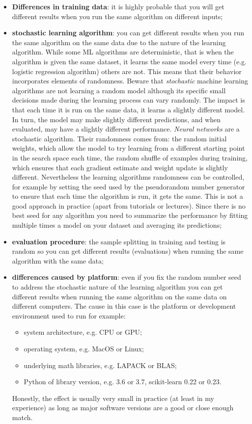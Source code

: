 \begin{itemize}
\item \textbf{Differences in training data}: it is highly probable that you will get different results when you run the same algorithm on different inputs;

\item \textbf{stochastic learning algorithm}: you can get different results when you run the same algorithm on the same data due to the nature of the learning algorithm. 
While some ML algorithms are deterministic, that is when the algorithm is given the same dataset, it learns the same model every time (e.g. logistic regression algorithm) others are not. This means that their behavior incorporates elements of randomness.
Beware that \emph{stochastic} machine learning algorithms are not learning a random model although its specific small decisions made during the learning process can vary randomly.
The impact is that each time it is run on the same data, it learns a slightly different model. In turn, the model may make slightly different predictions, and when evaluated, may have a slightly different performance.
\emph{Neural networks} are a stochastic algorithm. Their randomness comes from: the random initial weights, which allow the model to try learning from a different starting point in the search space each time, the random shuffle of examples during training, which ensures that each gradient estimate and weight update is slightly different.
Nevertheless the learning algorithms randomness can be controlled, for example by setting the seed used by the pseudorandom number generator to ensure that each time the algorithm is run, it gets the same.
This is not a good approach in practice (apart from tutorials or lectures). Since there is no best seed for any algorithm you need to summarize the performance by fitting multiple times a model on your dataset and averaging its predictions;

\item \textbf{evaluation procedure}: the sample splitting in training and testing is random so you can get different results (evaluations) when running the same algorithm with the same data;

\item \textbf{differences caused by platform}: even if you fix the random number seed to address the stochastic nature of the learning algorithm you can get different results when running the same algorithm on the same data on different computers.
The cause in this case is the platform or development environment used to run for example:
\begin{itemize}
\tightlist
\item system architecture, e.g. CPU or GPU;
\item operating system, e.g. MacOS or Linux;
\item underlying math libraries, e.g. LAPACK or BLAS;
\item Python of library version, e.g. 3.6 or 3.7, scikit-learn 0.22 or 0.23.
\end{itemize}
Honestly, the effect is usually very small in practice (at least in my experience) as long as major software versions are a good or close enough match.
\end{itemize}

